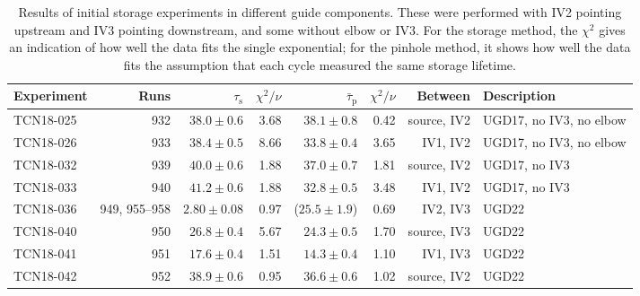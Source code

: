 \documentclass[10pt,letterpaper]{article}
\begin{document}
\begin{table}
\caption{Results of initial storage experiments in different guide components. These were performed with IV2 pointing upstream and IV3 pointing downstream, and some without elbow or IV3. For the storage method, the $\chi^2$ gives an indication of how well the data fits the single exponential; for the pinhole method, it shows how well the data fits the assumption that each cycle measured the same storage lifetime.}
\begin{tabular}{l r r r r r r l}
\toprule
Experiment & Runs & $\tau_\mathrm{s}$ & $\chi^2/\nu$ & $\bar{\tau}_\mathrm{p}$ & $\chi^2/\nu$ & Between & Description \\
\midrule
TCN18-025 & 932 & $38.0 \pm 0.6$ & 3.68 & $38.1 \pm 0.8$ & 0.42 & source, IV2 & UGD17, no IV3, no elbow \\
TCN18-026 & 933 & $38.4 \pm 0.5$ & 8.66 & $33.8 \pm 0.4$ & 3.65 & IV1, IV2 & UGD17, no IV3, no elbow \\
TCN18-032 & 939 & $40.0 \pm 0.6$ & 1.88 & $37.0 \pm 0.7$ & 1.81 & source, IV2 & UGD17, no IV3 \\
TCN18-033 & 940 & $41.2 \pm 0.6$ & 1.88 & $32.8 \pm 0.5$ & 3.48 & IV1, IV2 & UGD17, no IV3 \\
TCN18-036 & 949, 955--958 & $2.80 \pm 0.08$ & 0.97 & ($25.5 \pm 1.9$) & 0.69 & IV2, IV3 & UGD22 \\
TCN18-040 & 950 & $26.8 \pm 0.4$ & 5.67 & $24.3 \pm 0.5$ & 1.70 & source, IV3 & UGD22 \\
TCN18-041 & 951 & $17.6 \pm 0.4$ & 1.51 & $14.3 \pm 0.4$ & 1.10 & IV1, IV3 & UGD22 \\
TCN18-042 & 952 & $38.9 \pm 0.6$ & 0.95 & $36.6 \pm 0.6$ & 1.02 & source, IV2 & UGD22 \\
\bottomrule
\end{tabular}
\label{tab:storagelifetime_with_monitor1}


\end{table}
\end{document}
